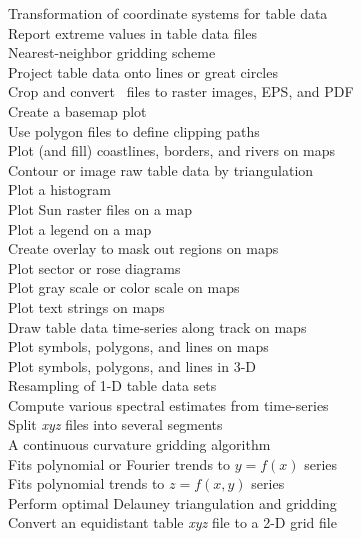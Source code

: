 \begin{tabbing}
	\>	Transformation of coordinate systems for table data \\ 
	\>	Report extreme values in table data files \\ 
	\>	Nearest-neighbor gridding scheme \\ 
	\>	Project table data onto lines or great circles \\ 
	\>	Crop and convert \PS\ files to raster images, EPS, and PDF \\
	\>	Create a basemap plot \\ 
	\>	Use polygon files to define clipping paths \\ 
	\>	Plot (and fill) coastlines, borders, and rivers on maps \\ 
	\>	Contour or image raw table data by triangulation \\ 
	\>	Plot a histogram \\ 
	\>	Plot Sun raster files on a map \\ 
	\>	Plot a legend on a map \\ 
	\>	Create overlay to mask out regions on maps \\ 
	\>	Plot sector or rose diagrams \\ 
	\>	Plot gray scale or color scale on maps \\ 
	\>	Plot text strings on maps \\ 
	\>	Draw table data time-series along track on maps \\ 
		\>	Plot symbols, polygons, and lines on maps \\ 
		\>	Plot symbols, polygons, and lines in 3-D \\ 
	\>	Resampling of 1-D table data sets \\ 
	\>	Compute various spectral estimates from time-series \\ 
	\>	Split \emph{xyz} files into several segments \\ 
	\>	A continuous curvature gridding algorithm \\ 
	\>	Fits polynomial or Fourier trends to $y = f(x)$ series \\ 
	\>	Fits polynomial trends to $z = f(x,y)$ series \\ 
	\>	Perform optimal Delauney triangulation and gridding \\ 
	\>	Convert an equidistant table \emph{xyz} file to a 2-D grid file
\end{tabbing}

